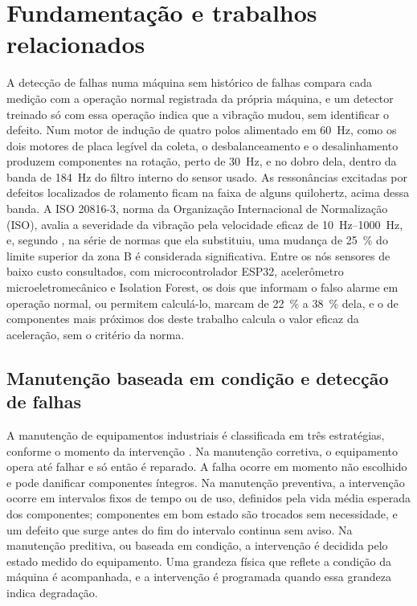 \chapter{Fundamentação e trabalhos relacionados}\label{cap:fundamentacao}

A detecção de falhas numa máquina sem histórico de falhas compara cada medição com a operação normal registrada da própria máquina, e um detector treinado só com essa operação indica que a vibração mudou, sem identificar o defeito. Num motor de indução de quatro polos alimentado em \SI{60}{\hertz}, como os dois motores de placa legível da coleta, o desbalanceamento e o desalinhamento produzem componentes na rotação, perto de \SI{30}{\hertz}, e no dobro dela, dentro da banda de \SI{184}{\hertz} do filtro interno do sensor usado. As ressonâncias excitadas por defeitos localizados de rolamento ficam na faixa de alguns quilohertz, acima dessa banda. A ISO 20816-3, norma da Organização Internacional de Normalização (ISO), avalia a severidade da vibração pela velocidade eficaz de \SIrange{10}{1000}{\hertz}, e, segundo , na série de normas que ela substituiu, uma mudança de \SI{25}{\percent} do limite superior da zona B é considerada significativa. Entre os nós sensores de baixo custo consultados, com microcontrolador ESP32, acelerômetro microeletromecânico e Isolation Forest, os dois que informam o falso alarme em operação normal, ou permitem calculá-lo, marcam de \SI{22}{\percent} a \SI{38}{\percent} dela, e o de componentes mais próximos dos deste trabalho calcula o valor eficaz da aceleração, sem o critério da norma.

\section{Manutenção baseada em condição e detecção de falhas}\label{sec:fund-manutencao}

A manutenção de equipamentos industriais é classificada em três estratégias, conforme o momento da intervenção \cite{mobley2002}. Na manutenção corretiva, o equipamento opera até falhar e só então é reparado. A falha ocorre em momento não escolhido e pode danificar componentes íntegros. Na manutenção preventiva, a intervenção ocorre em intervalos fixos de tempo ou de uso, definidos pela vida média esperada dos componentes; componentes em bom estado são trocados sem necessidade, e um defeito que surge antes do fim do intervalo continua sem aviso. Na manutenção preditiva, ou baseada em condição, a intervenção é decidida pelo estado medido do equipamento. Uma grandeza física que reflete a condição da máquina é acompanhada, e a intervenção é programada quando essa grandeza indica degradação.

